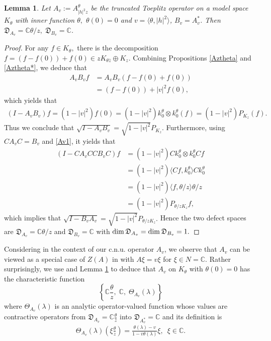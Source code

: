\documentclass[12pt,reqno]{amsart}
\newtheorem{lem}[thm]{Lemma}
\theoremstyle{definition}
\theoremstyle{remark}
\numberwithin{equation}{section}
\newcommand{\la}{\langle}
\newcommand{\ra}{\rangle}
\newcommand{\ol}{\overline}
\def\dim{\mathop{\rm dim}\nolimits}
\begin{document}
\begin{lem}\label{lem defect}  Let $A_v:=A_{|h|^2z}^\theta$ be the truncated Toeplitz operator on  a model space $K_\theta$ with  inner function $\theta,$ $\theta(0)=0$ and $v=\la \theta, |h|^2\ra$, $B_v=A_v^*$.   Then   $\mathfrak{D}_{A_v}= \mathbb{C}\theta/z,\; \mathfrak{D}_{B_v}=\mathbb{C}$. \end{lem}
 \begin{proof}For any $f\in K_\theta,$ there is the decomposition $f=(f-f(0))+f(0)\in zK_{\theta\ol{z}}\oplus K_z$. Combining Propositions \ref{Aztheta} and \ref{Aztheta*}, we deduce that
\begin{align*} A_v B_v f&=A_v B_v (f-f(0)+f(0)) \\&=(f-f(0))+ |v|^2 f(0), \end{align*} which yields that
\begin{align}(I-A_v B_v)f=(1-|v |^2)f(0)=(1-|v|^2)k_0^\theta\otimes k_0^\theta(f)=(1-|v|^2)P_{K_z}(f).\label{Av1}\end{align} Thus we conclude that $\sqrt{I-A_v B_v}=\sqrt{1-|v|^2}P_{K_z}.$
Furthermore, using $CA_v C=B_v$ and \eqref{Av1}, it yields that
\begin{align*} (I-CA_v CC B_vC)f&=(1-|v|^2)Ck_0^\theta \otimes k_0^\theta Cf\\&=(1-| v|^2)\la Cf,k_0^\theta\ra Ck_0^\theta\\&=(1-|v|^2)\la f, \theta/z\ra \theta/z\\&=(1-|v|^2) P_{ \theta/zK_z}f, \end{align*}
which implies that $\sqrt{I- B_v A_v}=\sqrt{1-|v |^2}P_{ \theta/zK_z}.$ Hence the two  defect spaces are $\mathfrak{D}_{A_v}=\mathbb{C} \theta/z$ and $\mathfrak{D}_{B_v} = \mathbb{C}$ with    $\dim \mathfrak{D}_{A_v}=\dim \mathfrak{D}_{B_v}=1.$
\end{proof}

Considering \cite[Theorem 2.3]{NFBK} in the context of our  c.n.u. operator $A_v$, we observe that $A_v$ can be viewed as a special case of $Z(A)$ in \cite[Definition 2.1]{Fu} with $A \xi=v\xi$ for $\xi\in N=\mathbb{C}$. Rather surprisingly, we  use \cite[Theorem 3.2]{Fu} and Lemma \ref{lem defect}  to deduce that $A_v$ on $K_\theta$ with $\theta(0)=0$ has the characteristic function $$\left\{\mathbb{C}\frac{\theta}{z},\;\mathbb{C},\;\Theta_{A_v}(\lambda)
\right\}$$ where $\Theta_{A_v}(\lambda)$ is an analytic operator-valued function whose values are contractive operators from $\mathfrak{D}_{A_v}=\mathbb{C}\frac{\theta}{z} $ into $\mathfrak{D}_{A_v^*}=\mathbb{C}$ and its definition is \begin{align} \Theta_{A_v}(\lambda)\left(\xi\frac{\theta}{z}\right)=
\frac{\theta(\lambda)-v}{1-\ol{v}\theta(\lambda)}\xi,\;~\xi\in \mathbb{C}.\label{Theta}\end{align}
\end{document}
